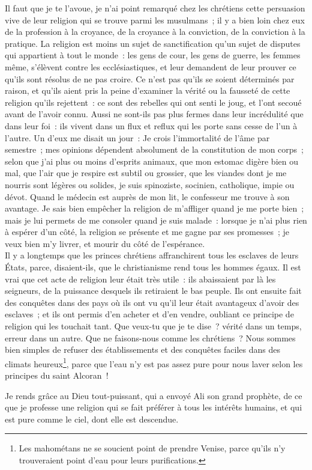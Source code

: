 \documentclass[french,twoside]{book} %
\begin{document}
\noindent Il faut que je te l’avoue, je n’ai point remarqué chez les chrétiens cette persuasion vive de leur religion qui se trouve parmi les musulmans ; il y a bien loin chez eux de la profession à la croyance, de la croyance à la conviction, de la conviction à la pratique. La religion est moins un sujet de sanctification qu’un sujet de disputes qui appartient à tout le monde : les gens de cour, les gens de guerre, les femmes même, s’élèvent contre les ecclésiastiques, et leur demandent de leur prouver ce qu’ils sont résolus de ne pas croire. Ce n’est pas qu’ils se soient déterminés par raison, et qu’ils aient pris la peine d’examiner la vérité ou la fausseté de cette religion qu’ils rejettent : ce sont des rebelles qui ont senti le joug, et l’ont secoué avant de l’avoir connu. Aussi ne sont-ils pas plus fermes dans leur incrédulité que dans leur foi : ils vivent dans un flux et reflux qui les porte sans cesse de l’un à l’autre. Un d’eux me disait un jour : Je crois l’immortalité de l’âme par semestre ; mes opinions dépendent absolument de la constitution de mon corps ; selon que j’ai plus ou moins d’esprits animaux, que mon estomac digère bien ou mal, que l’air que je respire est subtil ou grossier, que les viandes dont je me nourris sont légères ou solides, je suis spinoziste, socinien, catholique, impie ou dévot. Quand le médecin est auprès de mon lit, le confesseur me trouve à son avantage. Je sais bien empêcher la religion de m’affliger quand je me porte bien ; mais je lui permets de me consoler quand je suis malade : lorsque je n’ai plus rien à espérer d’un côté, la religion se présente et me gagne par ses promesses ; je veux bien m’y livrer, et mourir du côté de l’espérance. \\
Il y a longtemps que les princes chrétiens affranchirent tous les esclaves de leurs États, parce, disaient-ils, que le christianisme rend tous les hommes égaux. Il est vrai que cet acte de religion leur était très utile : ils abaissaient par là les seigneurs, de la puissance desquels ils retiraient le bas peuple. Ils ont ensuite fait des conquêtes dans des pays où ils ont vu qu’il leur était avantageux d’avoir des esclaves ; et ils ont permis d’en acheter et d’en vendre, oubliant ce principe de religion qui les touchait tant. Que veux-tu que je te dise ? vérité dans un temps, erreur dans un autre. Que ne faisons-nous comme les chrétiens ? Nous sommes bien simples de refuser des établissements et des conquêtes faciles dans des climats heureux\footnote{Les mahométans ne se soucient point de prendre Venise, parce qu’ils n’y trouveraient point d’eau pour leurs purifications.}, parce que l’eau n’y est pas assez pure pour nous laver selon les principes du saint Alcoran !\par
Je rends grâce au Dieu tout-puissant, qui a envoyé Ali son grand prophète, de ce que je professe une religion qui se fait préférer à tous les intérêts humains, et qui est pure comme le ciel, dont elle est descendue.\par
\end{document}
